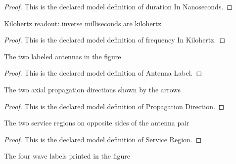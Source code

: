 \begin{proof}
  This is the declared model definition of duration In Nanoseconds.
\end{proof}
\begin{definition}
  \label{def:physics:phyx-mini-0187:phyxminiproblems-problemphyxmini0187-frequencyinkilohertz}
  Kilohertz readout: inverse milliseconds are kilohertz
\end{definition}
\begin{proof}
  This is the declared model definition of frequency In Kilohertz.
\end{proof}
\begin{definition}
  \label{def:physics:phyx-mini-0187:phyxminiproblems-problemphyxmini0187-antennalabel}
  The two labeled antennas in the figure
\end{definition}
\begin{proof}
  This is the declared model definition of Antenna Label.
\end{proof}
\begin{definition}
  \label{def:physics:phyx-mini-0187:phyxminiproblems-problemphyxmini0187-propagationdirection}
  The two axial propagation directions shown by the arrows
\end{definition}
\begin{proof}
  This is the declared model definition of Propagation Direction.
\end{proof}
\begin{definition}
  \label{def:physics:phyx-mini-0187:phyxminiproblems-problemphyxmini0187-serviceregion}
  The two service regions on opposite sides of the antenna pair
\end{definition}
\begin{proof}
  This is the declared model definition of Service Region.
\end{proof}
\begin{definition}
  \label{def:physics:phyx-mini-0187:phyxminiproblems-problemphyxmini0187-radiatedwavelabel}
  The four wave labels printed in the figure
\end{definition}
